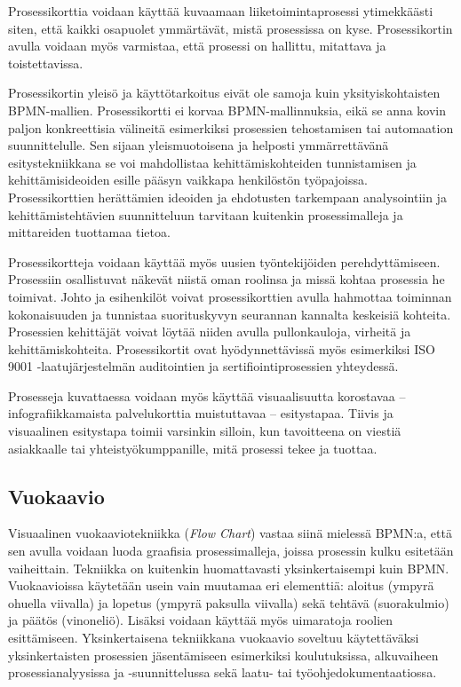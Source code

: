 \documentclass[
  finnish,
  letterpaper,
  DIV=11,
  numbers=noendperiod,
  oneside]{scrreprt}
\newcounter{none} %
\begin{document}
Prosessikorttia voidaan käyttää kuvaamaan liiketoimintaprosessi
ytimekkäästi siten, että kaikki osapuolet ymmärtävät, mistä prosessissa
on kyse. Prosessikortin avulla voidaan myös varmistaa, että prosessi on
hallittu, mitattava ja toistettavissa.

Prosessikortin yleisö ja käyttötarkoitus eivät ole samoja kuin
yksityiskohtaisten BPMN-mallien. Prosessikortti ei korvaa
BPMN-mallinnuksia, eikä se anna kovin paljon konkreettisia välineitä
esimerkiksi prosessien tehostamisen tai automaation suunnittelulle. Sen
sijaan yleismuotoisena ja helposti ymmärrettävänä esitystekniikkana se
voi mahdollistaa kehittämiskohteiden tunnistamisen ja kehittämisideoiden
esille pääsyn vaikkapa henkilöstön työpajoissa. Prosessikorttien
herättämien ideoiden ja ehdotusten tarkempaan analysointiin ja
kehittämistehtävien suunnitteluun tarvitaan kuitenkin prosessimalleja ja
mittareiden tuottamaa tietoa.

Prosessikortteja voidaan käyttää myös uusien työntekijöiden
perehdyttämiseen. Prosessiin osallistuvat näkevät niistä oman roolinsa
ja missä kohtaa prosessia he toimivat. Johto ja esihenkilöt voivat
prosessikorttien avulla hahmottaa toiminnan kokonaisuuden ja tunnistaa
suorituskyvyn seurannan kannalta keskeisiä kohteita. Prosessien
kehittäjät voivat löytää niiden avulla pullonkauloja, virheitä ja
kehittämiskohteita. Prosessikortit ovat hyödynnettävissä myös
esimerkiksi ISO 9001
-laatujärjestelmän auditointien ja sertifiointiprosessien yhteydessä.

Prosesseja kuvattaessa voidaan myös käyttää visuaalisuutta korostavaa --
infografiikkamaista palvelukorttia muistuttavaa -- esitystapaa. Tiivis
ja visuaalinen esitystapa toimii varsinkin silloin, kun tavoitteena on
viestiä asiakkaalle tai yhteistyökumppanille, mitä prosessi tekee ja
tuottaa.

\subsection{Vuokaavio}\label{vuokaavio}

Visuaalinen vuokaaviotekniikka (\emph{Flow Chart}) vastaa siinä mielessä
BPMN:a, että sen avulla voidaan luoda graafisia prosessimalleja, joissa
prosessin kulku esitetään vaiheittain. Tekniikka on kuitenkin
huomattavasti yksinkertaisempi kuin BPMN. Vuokaavioissa käytetään usein
vain muutamaa eri elementtiä: aloitus (ympyrä ohuella viivalla) ja
lopetus (ympyrä paksulla viivalla) sekä tehtävä (suorakulmio) ja päätös
(vinoneliö). Lisäksi voidaan käyttää myös uimaratoja roolien
esittämiseen. Yksinkertaisena tekniikkana vuokaavio soveltuu
käytettäväksi yksinkertaisten prosessien jäsentämiseen esimerkiksi
koulutuksissa, alkuvaiheen prosessianalyysissa ja -suunnittelussa sekä
laatu- tai työohjedokumentaatiossa.
\end{document}
